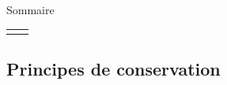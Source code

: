 

\begin{frame}{Sommaire}

\small
  
\hspace*{2mm}
\begin{tabular}{cc}
  		\begin{minipage}{62mm}
  			\tableofcontents[firstsection=-2]
      \vspace{15mm}
  		\end{minipage}
  		&   
  		\begin{minipage}{60cm}
		  \vspace*{-5mm}  
  		\end{minipage}
  	\end{tabular}

\vspace{0mm}

\end{frame}


\subsection{Principes de conservation}


